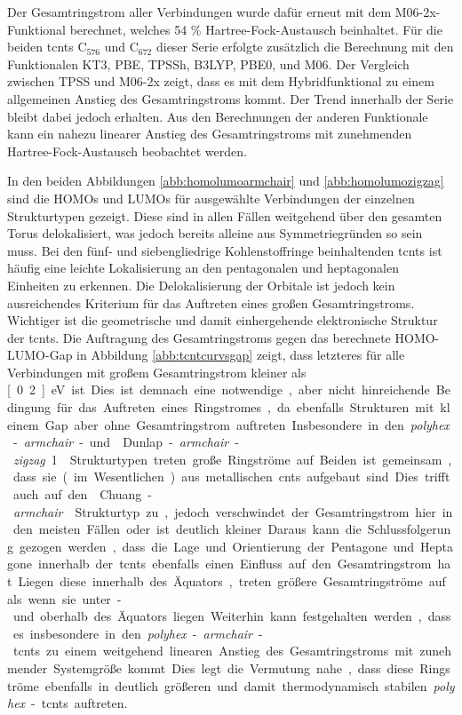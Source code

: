 Der Gesamtringstrom aller Verbindungen wurde dafür erneut mit dem M06-2x-Funktional\supercite{zhao2008m06} berechnet, welches 54 \% Hartree-Fock-Austausch beinhaltet. Für die beiden \acp{tcnt} C$_{576}$ und C$_{672}$ dieser Serie erfolgte zusätzlich die Berechnung mit den Funktionalen KT3,\supercite{keal2004semiempirical} PBE,\supercite{perdew1996generalized} TPSSh,\supercite{staroverov2003comparative} B3LYP,\supercite{becke1993density,lee1988development,stephens1994ab} PBE0,\supercite{adamo1999toward} und M06.\supercite{zhao2008m06} Der Vergleich zwischen TPSS und M06-2x zeigt, dass es mit dem Hybridfunktional zu einem allgemeinen Anstieg des Gesamtringstroms kommt. Der Trend innerhalb der Serie bleibt dabei jedoch erhalten. Aus den Berechnungen der anderen Funktionale kann ein nahezu linearer Anstieg des Gesamtringstroms mit zunehmenden Hartree-Fock-Austausch beobachtet werden.

\bigskip
In den beiden Abbildungen \ref{abb:homolumoarmchair} und \ref{abb:homolumozigzag} sind die HOMOs und LUMOs für ausgewählte Verbindungen der einzelnen Strukturtypen gezeigt. Diese sind in allen Fällen weitgehend über den gesamten Torus delokalisiert, was jedoch bereits alleine aus Symmetriegründen so sein muss. Bei den fünf- und siebengliedrige Kohlenstoffringe beinhaltenden \acp{tcnt} ist häufig eine leichte Lokalisierung an den pentagonalen und heptagonalen Einheiten zu erkennen. Die Delokalisierung der Orbitale ist jedoch kein ausreichendes Kriterium für das Auftreten eines großen Gesamtringstroms. Wichtiger ist die geometrische und damit einhergehende elektronische Struktur der \acp{tcnt}. Die Auftragung des Gesamtringstroms gegen das berechnete HOMO-LUMO-Gap in Abbildung \ref{abb:tcntcurvsgap} zeigt, dass letzteres für alle Verbindungen mit großem Gesamtringstrom kleiner als \unit[0.2]{eV} ist. Dies ist demnach eine notwendige, aber nicht hinreichende Bedingung für das Auftreten eines Ringstromes, da ebenfalls Strukturen mit kleinem Gap aber ohne Gesamtringstrom auftreten. Insbesondere in den \textit{polyhex}-\textit{armchair}- und \glqq Dunlap-\textit{armchair}-\textit{zigzag} 1\grqq{} Strukturtypen treten große Ringströme auf. Beiden ist gemeinsam, dass sie (im Wesentlichen) aus metallischen \acp{cnt} aufgebaut sind. Dies trifft auch auf den \glqq Chuang-\textit{armchair}\grqq{} Strukturtyp zu, jedoch verschwindet der Gesamtringstrom hier in den meisten Fällen oder ist deutlich kleiner. Daraus kann die Schlussfolgerung gezogen werden, dass die Lage und Orientierung der Pentagone und Heptagone innerhalb der \acp{tcnt} ebenfalls einen Einfluss auf den Gesamtringstrom hat. Liegen diese innerhalb des Äquators, treten größere Gesamtringströme auf als wenn sie unter- und oberhalb des Äquators liegen. Weiterhin kann festgehalten werden, dass es insbesondere in den \textit{polyhex}-\textit{armchair}-\acp{tcnt} zu einem weitgehend linearen Anstieg des Gesamtringstroms mit zunehmender Systemgröße kommt. Dies legt die Vermutung nahe, dass diese Ringströme ebenfalls in deutlich größeren und damit thermodynamisch stabilen \textit{polyhex}-\acp{tcnt} auftreten.

